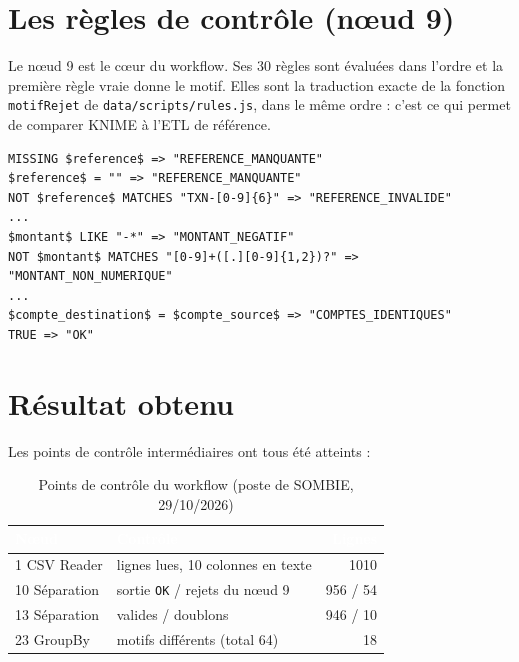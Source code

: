 \section{Les règles de contrôle (nœud 9)}
Le nœud 9 est le cœur du workflow. Ses 30 règles sont évaluées dans l'ordre et la première règle
vraie donne le motif. Elles sont la traduction exacte de la fonction \texttt{motifRejet} de
\texttt{data/scripts/rules.js}, dans le même ordre : c'est ce qui permet de comparer KNIME à l'ETL
de référence.

\begin{lstlisting}[caption={Début des règles du nœud 9 (Rule Engine)}]
MISSING $reference$ => "REFERENCE_MANQUANTE"
$reference$ = "" => "REFERENCE_MANQUANTE"
NOT $reference$ MATCHES "TXN-[0-9]{6}" => "REFERENCE_INVALIDE"
...
$montant$ LIKE "-*" => "MONTANT_NEGATIF"
NOT $montant$ MATCHES "[0-9]+([.][0-9]{1,2})?" => "MONTANT_NON_NUMERIQUE"
...
$compte_destination$ = $compte_source$ => "COMPTES_IDENTIQUES"
TRUE => "OK"
\end{lstlisting}


\section{Résultat obtenu}
Les points de contrôle intermédiaires ont tous été atteints :

\begin{table}[H]
\centering\small
\caption{Points de contrôle du workflow (poste de SOMBIE, 29/10/2026)}
\label{tab:knime-controles}
\begin{tabular}{|l|l|r|}
\hline
\rowcolor{bluedark}\textcolor{white}{\textbf{Nœud}} & \textcolor{white}{\textbf{Contrôle}} & \textcolor{white}{\textbf{Lignes}} \\
\hline
1 CSV Reader & lignes lues, 10 colonnes en texte & 1010 \\
\hline
10 Séparation & sortie \texttt{OK} / rejets du nœud 9 & 956 / 54 \\
\hline
13 Séparation & valides / doublons & 946 / 10 \\
\hline
23 GroupBy & motifs différents (total 64) & 18 \\
\hline
\end{tabular}
\end{table}

